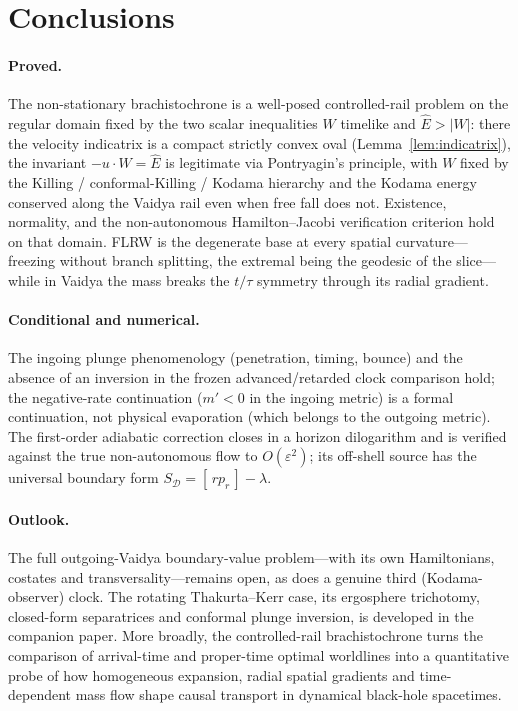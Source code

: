 \documentclass[12pt]{iopart}
\newcommand{\Ehat}{\hat E}
\theoremstyle{plain}
\theoremstyle{definition}
\theoremstyle{plain}
\theoremstyle{remark}
\begin{document}
\section{Conclusions}
\label{sec:concl}
\paragraph{Proved.} The non-stationary brachistochrone is a well-posed controlled-rail
problem on the regular domain fixed by the two scalar inequalities $W$ timelike and
$\Ehat>|W|$: there the velocity indicatrix is a compact strictly convex oval
(Lemma~\ref{lem:indicatrix}), the invariant $-u\cdot W=\Ehat$ is legitimate via
Pontryagin's principle, with $W$ fixed by the Killing / conformal-Killing / Kodama
hierarchy and the Kodama energy conserved along the Vaidya rail even when free fall does
not. Existence, normality, and the non-autonomous Hamilton--Jacobi verification criterion
hold on that domain. FLRW is the degenerate base at every spatial curvature---freezing
without branch splitting, the extremal being the geodesic of the slice---while in
Vaidya the mass breaks the $t/\tau$ symmetry through its radial gradient.

\paragraph{Conditional and numerical.} The ingoing plunge phenomenology (penetration,
timing, bounce) and the absence of an inversion in the frozen advanced/retarded clock
comparison hold; the negative-rate continuation ($m'<0$ in the ingoing metric) is a formal
continuation, not physical evaporation (which belongs to the outgoing metric). The
first-order adiabatic correction closes in a horizon dilogarithm and is verified against
the true non-autonomous flow to $O(\varepsilon^2)$; its off-shell source has the
universal boundary form $S_{\mathcal D}=[\,rp_r\,]-\lambda$.

\paragraph{Outlook.} The full outgoing-Vaidya boundary-value problem---with its own
Hamiltonians, costates and transversality---remains open, as does a genuine third
(Kodama-observer) clock. The rotating Thakurta--Kerr case, its ergosphere trichotomy,
closed-form separatrices and conformal plunge inversion, is developed in the companion
paper. More broadly, the controlled-rail brachistochrone turns the comparison of
arrival-time and proper-time optimal worldlines into a quantitative probe of how
homogeneous expansion, radial spatial gradients and time-dependent mass flow shape causal
transport in dynamical black-hole spacetimes.
\end{document}
